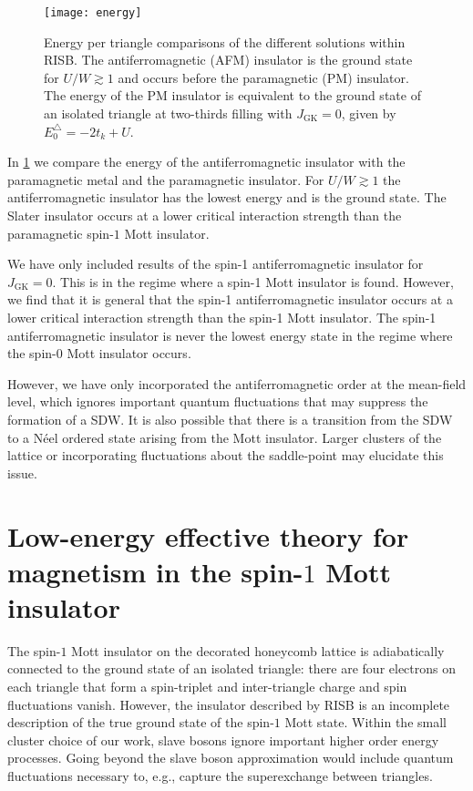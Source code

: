 \documentclass[reprint,aps,prb,amsmath,amssymb]{revtex4-2}
\begin{document}
\begin{figure}
	\centering
	\texttt{[image: energy]}
	\caption{\label{fig:energy}
		Energy per triangle comparisons of the different solutions within RISB. The antiferromagnetic (AFM) insulator is the ground state for $U / W \gtrsim 1$ and occurs before the paramagnetic (PM) insulator. The energy of the PM insulator is equivalent to the ground state of an isolated triangle at two-thirds filling with $J_{\mathrm{GK}} = 0$, given by $E_0^{\triangle} = -2t_k + U$.
	}
\end{figure}

In \cref{fig:energy} we compare the energy of the antiferromagnetic insulator with the paramagnetic metal and the paramagnetic insulator. For $U / W \gtrsim 1$ the antiferromagnetic insulator has the lowest energy and is the ground state. The Slater insulator occurs at a lower critical interaction strength than the paramagnetic spin-$1$ Mott insulator.

We have only included results of the spin-1 antiferromagnetic insulator for $J_{\textrm{GK}} = 0$. This is in the regime where a spin-1 Mott insulator is found. However, we find that it is general that the spin-1 antiferromagnetic insulator occurs at a lower critical interaction strength than the spin-1 Mott insulator. The spin-1 antiferromagnetic insulator is never the lowest energy state in the regime where the spin-0 Mott insulator occurs.

However, we have only incorporated the antiferromagnetic order at the mean-field level, which ignores important quantum fluctuations that may suppress the formation of a SDW. It is also possible that there is a transition from the SDW to a N\'eel ordered state arising from the Mott insulator. Larger clusters of the lattice or incorporating fluctuations about the saddle-point \cite{Fabrizio2017,Lanata2017b,Wysokinski2017} may elucidate this issue.

\section{Low-energy effective theory for magnetism in the spin-$1$ Mott insulator} \label{sec:low-energy-theory}

The spin-$1$ Mott insulator on the decorated honeycomb lattice is adiabatically connected to the ground state of an isolated triangle: there are four electrons on each triangle that form a spin-triplet and inter-triangle charge and spin fluctuations vanish. However, the insulator described by RISB is an incomplete description of the true ground state of the spin-$1$ Mott state. Within the small cluster choice of our work, slave bosons ignore important higher order energy processes. Going beyond the slave boson approximation would include quantum fluctuations necessary to, e.g., capture the superexchange between triangles. 
\end{document}
